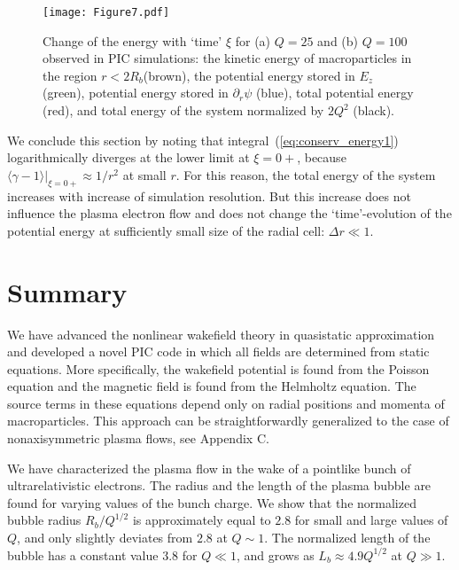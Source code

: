 \documentclass[twocolumn,showpacs,aip]{revtex4}
\begin{document}
\begin{figure}[t]
\centering
	\texttt{[image: Figure7.pdf]}\\
	 \caption{Change of the energy with `time' $\xi$  for (a) $Q=25$ and (b) $Q=100$ observed in PIC simulations:  the kinetic energy of macroparticles in the region $r<2R_b$(brown), the potential energy stored in $E_z$ (green), potential energy stored in $\partial_r\psi$ (blue),  total potential energy (red), and total energy of the system normalized by $2Q^2$ (black).}
\label{fig:energy_on_xi}
\end{figure}

We conclude this section by noting that  integral~(\ref{eq:conserv_energy1}) logarithmically diverges at the lower limit at $\xi=0+$, because $\langle\gamma-1\rangle|_{\xi=0+}\approx 1/r^2$ at small $r$.  For this reason,  the total energy of the system increases with increase of simulation resolution. But this increase does not influence   the plasma electron flow and does not change the `time'-evolution of the potential energy %
at sufficiently small size of the radial cell: $\Delta r\ll 1$. 

\section{Summary}
%
We have advanced the nonlinear wakefield theory in  quasistatic approximation and developed a novel PIC code in which all fields are determined  from  static equations.
More specifically, the wakefield potential is found from the Poisson equation  and the magnetic field is found from the Helmholtz equation. The  source terms in these equations depend only on radial  positions and momenta of macroparticles.   This approach can be straightforwardly generalized to the case of  nonaxisymmetric plasma flows, see Appendix C. 
	
We have characterized the plasma flow in the wake of a  pointlike bunch of ultrarelativistic electrons. The radius and the length of the plasma bubble are found for varying values of the bunch charge. We show that the normalized bubble radius $R_b/Q^{1/2}$ is approximately equal to $2.8$ for small and large values of $Q$, and  only slightly deviates  from $2.8$ at $Q\sim 1$. The normalized length of the bubble has a constant value 3.8 for $Q\ll 1$, and grows    as $L_b\approx 4.9Q^{1/2}$ at  $Q\gg 1$. 
	
\end{document}
